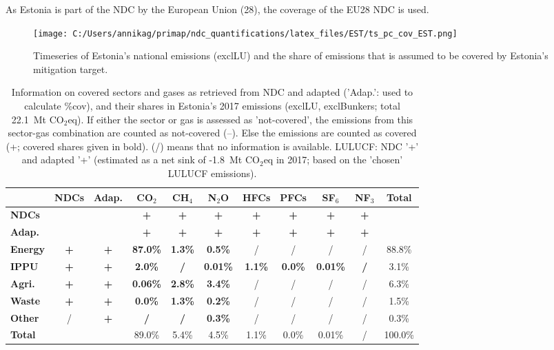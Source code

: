 \documentclass[12pt]{article}
\begin{document}
 As Estonia is part of the NDC by the European Union (28), the coverage of the EU28 NDC is used.

 \begin{figure}[H]
 \centering
 \texttt{[image: C:/Users/annikag/primap/ndc\_quantifications/latex\_files/EST/ts\_pc\_cov\_EST.png]}
 \caption{Timeseries of Estonia's national emissions (exclLU) and the share of emissions that is assumed to be covered by Estonia's mitigation target.}
 \label{fig:tsPcCov}
 \end{figure}

 \begin{table}[H]\small
 \centering
 \caption{Information on covered sectors and gases as retrieved from NDC and adapted ('Adap.': used to calculate \%cov), and their shares in Estonia's 2017 emissions (exclLU, exclBunkers; total 22.1~Mt CO$_2$eq).
 If either the sector or gas is assessed as 'not-covered', the emissions from this sector-gas combination are counted as not-covered (--). 
 Else the emissions are counted as covered (+; covered shares given in bold).
 (/) means that no information is available.
 LULUCF: NDC '+' and adapted '+' (estimated as a net sink of -1.8~Mt CO$_2$eq in 2017; based on the 'chosen' LULUCF emissions).}
 \label{tab:coveredSectorsGases}
 \begin{tabular}{l || c c || c c c c c c c | c}
 \bfseries  & \bfseries NDCs & \bfseries Adap. & \bfseries CO$_2$ & \bfseries CH$_4$ & \bfseries N$_2$O & \bfseries HFCs & \bfseries PFCs & \bfseries SF$_6$ & \bfseries NF$_3$ & \bfseries Total \tabularnewline \hline \hline
 \bfseries NDCs &  &  & \bfseries + & \bfseries + & \bfseries + & \bfseries + & \bfseries + & \bfseries + & \bfseries + &  \tabularnewline 
 \bfseries Adap. &  &  & \bfseries + & \bfseries + & \bfseries + & \bfseries + & \bfseries + & \bfseries + & \bfseries + &  \tabularnewline \hline \hline
 \bfseries Energy & \bfseries + & \bfseries + & \bfseries 87.0\% & \bfseries 1.3\% & \bfseries 0.5\% & / & / & / & / & 88.8\% \tabularnewline 
 \bfseries IPPU & \bfseries + & \bfseries + & \bfseries 2.0\% & \bfseries / & \bfseries 0.01\% & \bfseries 1.1\% & \bfseries 0.0\% & \bfseries 0.01\% & \bfseries / & 3.1\% \tabularnewline 
 \bfseries Agri. & \bfseries + & \bfseries + & \bfseries 0.06\% & \bfseries 2.8\% & \bfseries 3.4\% & / & / & / & / & 6.3\% \tabularnewline 
 \bfseries Waste & \bfseries + & \bfseries + & \bfseries 0.0\% & \bfseries 1.3\% & \bfseries 0.2\% & / & / & / & / & 1.5\% \tabularnewline 
 \bfseries Other & / & \bfseries + & \bfseries / & \bfseries / & \bfseries 0.3\% & / & / & / & / & 0.3\% \tabularnewline \hline
 \bfseries Total &  &  & 89.0\% & 5.4\% & 4.5\% & 1.1\% & 0.0\% & 0.01\% & / & 100.0\% \tabularnewline 
 \end{tabular}
 \end{table}
\end{document}
